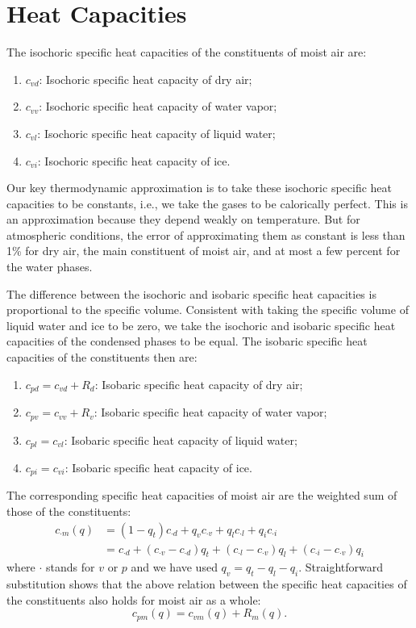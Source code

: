 \documentclass{report}
\begin{document}
\section{Heat Capacities}\label{s:heat_capacities}

The isochoric specific heat capacities of the constituents of moist air are:
\begin{enumerate}
    \item $c_{vd}$: Isochoric specific heat capacity of dry air;
    \item $c_{vv}$: Isochoric specific heat capacity of water vapor;
    \item $c_{vl}$: Isochoric specific heat capacity of liquid water;
    \item $c_{vi}$: Isochoric specific heat capacity of ice.
\end{enumerate}
Our key thermodynamic approximation is to take these isochoric specific heat capacities to be constants, i.e., we take the gases to be calorically perfect. This is an approximation because they depend weakly on temperature. But for atmospheric conditions, the error of approximating them as constant is less than 1\% for dry air, the main constituent of moist air, and at most a few percent for the water phases.

The difference between the isochoric and isobaric specific heat capacities is proportional to the specific volume. Consistent with taking the specific volume of liquid water and ice to be zero, we take the isochoric and isobaric specific heat capacities of the condensed phases to be equal. The isobaric specific heat capacities of the constituents then are:
\begin{enumerate}
    \item $c_{pd} = c_{vd} + R_d$: Isobaric specific heat capacity of dry air;
    \item $c_{pv} = c_{vv} + R_v$: Isobaric specific heat capacity of water vapor;
    \item $c_{pl} = c_{vl}$: Isobaric specific heat capacity of liquid water;
    \item $c_{pi} = c_{vi}$: Isobaric specific heat capacity of ice.
\end{enumerate}

The corresponding specific heat capacities of moist air are the weighted sum of those of the constituents:
\begin{align}
    c_{\cdot m}(q) & = (1-q_t) c_{\cdot d} + q_v c_{\cdot v} + q_l c_{\cdot l} + q_i c_{\cdot i} \label{e:specific_heat}\\
    & = c_{\cdot d} + (c_{\cdot v} - c_{\cdot d})q_t + (c_{\cdot l} - c_{\cdot v})q_l + (c_{\cdot i} - c_{\cdot v})q_i
\end{align}
where $\cdot$ stands for $v$ or $p$ and we have used $q_v = q_t -q_l - q_i$. Straightforward substitution shows that the above relation between the specific heat capacities of the constituents also holds for moist air as a whole:
\begin{equation}\label{e:specific_heat_relation}
    c_{pm}(q) = c_{vm}(q) + R_m(q).
\end{equation}
\end{document}
